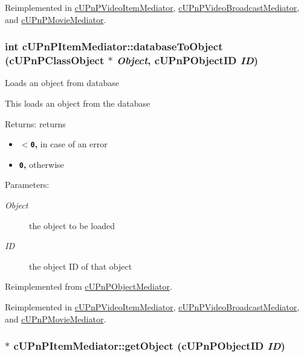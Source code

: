 Reimplemented in \hyperlink{classcUPnPVideoItemMediator_27e001142c3651c36dfd3b7c450414c0}{cUPnPVideoItemMediator}, \hyperlink{classcUPnPVideoBroadcastMediator_14fefa90807d40d91a80712729af2beb}{cUPnPVideoBroadcastMediator}, and \hyperlink{classcUPnPMovieMediator_29d40a311b7283cc4fba36860ac8c935}{cUPnPMovieMediator}.\hypertarget{classcUPnPItemMediator_1f3645ebe0a33a81d0b3f22060dc4761}{
\subsubsection[{databaseToObject}]{\setlength{\rightskip}{0pt plus 5cm}int cUPnPItemMediator::databaseToObject ({\bf cUPnPClassObject} $\ast$ {\em Object}, \/  {\bf cUPnPObjectID} {\em ID})}}
\label{classcUPnPItemMediator_1f3645ebe0a33a81d0b3f22060dc4761}


Loads an object from database

This loads an object from the database

\begin{Desc}
\item[Returns:]returns\begin{itemize}
\item {\bf {\tt $<$0},} in case of an error\item {\bf {\tt 0},} otherwise \end{itemize}
\end{Desc}
\begin{Desc}
\item[Parameters:]
\begin{description}
\item[{\em Object}]the object to be loaded \item[{\em ID}]the object ID of that object \end{description}
\end{Desc}
 

Reimplemented from \hyperlink{classcUPnPObjectMediator_07a6a1d2694fb2f4573bd50374406b24}{cUPnPObjectMediator}.

Reimplemented in \hyperlink{classcUPnPVideoItemMediator_3f7ec1937b2b95e3ec5462470971d350}{cUPnPVideoItemMediator}, \hyperlink{classcUPnPVideoBroadcastMediator_33237e5d850c107d37be37c1646b17d7}{cUPnPVideoBroadcastMediator}, and \hyperlink{classcUPnPMovieMediator_542135e9c1051b57a8f6f5ecc0c1ede3}{cUPnPMovieMediator}.\hypertarget{classcUPnPItemMediator_81411b2a472ade71d73a9c8ddc2a7990}{
\subsubsection[{getObject}]{ $\ast$ cUPnPItemMediator::getObject ({\bf cUPnPObjectID} {\em ID})}}
\label{classcUPnPItemMediator_81411b2a472ade71d73a9c8ddc2a7990}


